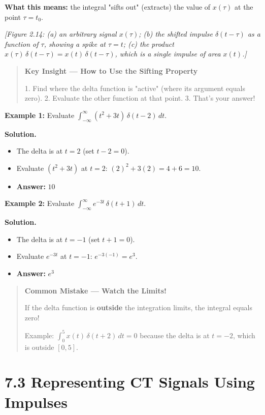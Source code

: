 \documentclass[11pt]{article}
\begin{document}
\textbf{What this means:} the integral "sifts out" (extracts) the value of $x(\tau)$ at the point $\tau = t_0$.

\textit{[Figure 2.14: (a) an arbitrary signal $x(\tau)$; (b) the shifted impulse $\delta(t-\tau)$ as a function of $\tau$, showing a spike at $\tau = t$; (c) the product $x(\tau)\,\delta(t-\tau) = x(t)\,\delta(t-\tau)$, which is a single impulse of area $x(t)$.]}

\begin{quote}
\textbf{Key Insight — How to Use the Sifting Property}

1. Find where the delta function is "active" (where its argument equals zero).
2. Evaluate the other function at that point.
3. That's your answer!
\end{quote}

\textbf{Example 1:} Evaluate $\displaystyle\int_{-\infty}^{\infty} (t^2 + 3t)\,\delta(t-2)\,dt$.

\textbf{Solution.}

\begin{itemize}
  \item The delta is at $t=2$ (set $t-2=0$).
  \item Evaluate $(t^2+3t)$ at $t=2$: $(2)^2 + 3(2) = 4 + 6 = 10$.
  \item \textbf{Answer:} $\boxed{10}$
\end{itemize}

\textbf{Example 2:} Evaluate $\displaystyle\int_{-\infty}^{\infty} e^{-3t}\,\delta(t+1)\,dt$.

\textbf{Solution.}

\begin{itemize}
  \item The delta is at $t = -1$ (set $t+1=0$).
  \item Evaluate $e^{-3t}$ at $t=-1$: $e^{-3(-1)} = e^{3}$.
  \item \textbf{Answer:} $\boxed{e^{3}}$
\end{itemize}

\begin{quote}
\textbf{Common Mistake — Watch the Limits!}

If the delta function is \textbf{outside} the integration limits, the integral equals zero!

Example: $\displaystyle\int_0^5 x(t)\,\delta(t+2)\,dt = 0$ because the delta is at $t=-2$, which is outside $[0,5]$.
\end{quote}

\section*{7.3 Representing CT Signals Using Impulses}
\end{document}
